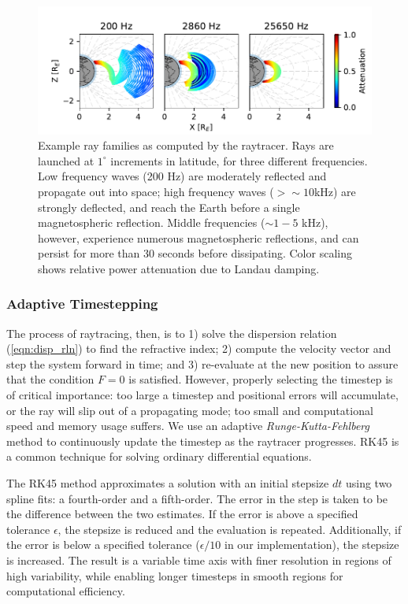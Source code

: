 \begin{figure}[ht]
\begin{center}
\includegraphics{Figures/raytracing_example.pdf}
\end{center}
\caption[Example ray tracing]{Example ray families as computed by the raytracer. Rays are launched at $1^\circ$ increments in latitude, for three different frequencies. Low frequency waves (200 Hz) are moderately reflected and propagate out into space; high frequency waves ($> \sim 10 $kHz) are strongly deflected, and reach the Earth before a single magnetospheric reflection. Middle frequencies ($\sim 1-5$ kHz), however, experience numerous magnetospheric reflections, and can persist for more than 30 seconds before dissipating. Color scaling shows relative power attenuation due to Landau damping.} 
\label{fig:raytracing_example}
\end{figure}
\subsubsection{Adaptive Timestepping}
The process of raytracing, then, is to 1) solve the dispersion relation (\ref{eqn:disp_rln}) to find the refractive index; 2) compute the velocity vector and step the system forward in time; and 3) re-evaluate at the new position to assure that the condition $F=0$ is satisfied. However, properly selecting the timestep is of critical importance: too large a timestep and positional errors will accumulate, or the ray will slip out of a propagating mode; too small and computational speed and memory usage suffers. We use an adaptive \emph{Runge-Kutta-Fehlberg} \citep[RK45;][]{Fehlberg1969, Mathews2004} method to continuously update the timestep as the raytracer progresses. RK45 is a common technique for solving ordinary differential equations.

The RK45 method approximates a solution with an initial stepsize $dt$ using two spline fits: a fourth-order and a fifth-order. The error in the step is taken to be the difference between the two estimates. If the error is above a specified tolerance $\epsilon$, the stepsize is reduced and the evaluation is repeated. Additionally, if the error is below a specified tolerance ($\epsilon/10$ in our implementation), the stepsize is increased. The result is a variable time axis with finer resolution in regions of high variability, while enabling longer timesteps in smooth regions for computational efficiency.

